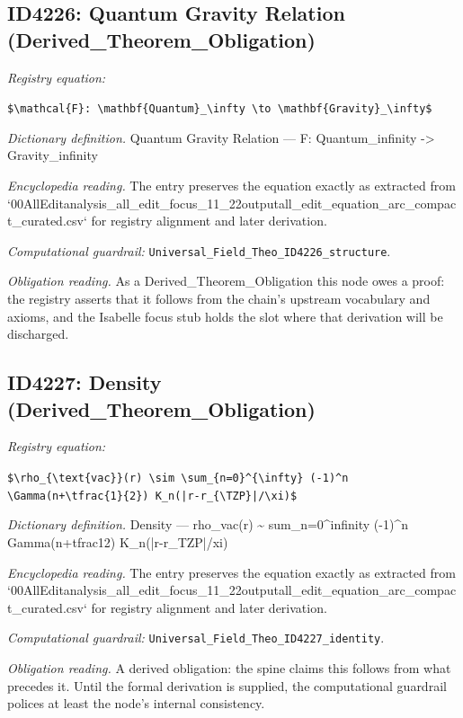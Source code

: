 \documentclass[11pt]{article}
\theoremstyle{remark}
\begin{document}
\subsection{ID4226: Quantum Gravity Relation (Derived\_Theorem\_Obligation)}

\noindent\textit{Registry equation:}\par
{\small\texttt{\$\textbackslash{}mathcal\{F\}: \textbackslash{}mathbf\{Quantum\}\_\textbackslash{}infty \textbackslash{}to \textbackslash{}mathbf\{Gravity\}\_\textbackslash{}infty\$}}\par\medskip
\noindent\textit{Dictionary definition.} Quantum Gravity Relation --- F: Quantum\_infinity -> Gravity\_infinity\par\medskip
\noindent\textit{Encyclopedia reading.} The entry preserves the equation exactly as extracted from `00AllEditanalysis\_all\_edit\_focus\_11\_22outputall\_edit\_equation\_arc\_compact\_curated.csv` for registry alignment and later derivation.
\par\medskip\noindent\textit{Computational guardrail:} \texttt{Universal\_Field\_Theo\_ID4226\_structure}.
\par\medskip\noindent\textit{Obligation reading.} As a Derived\_Theorem\_Obligation this node owes a proof: the registry asserts that it follows from the chain's upstream vocabulary and axioms, and the Isabelle focus stub holds the slot where that derivation will be discharged.

\subsection{ID4227: Density (Derived\_Theorem\_Obligation)}

\noindent\textit{Registry equation:}\par
{\small\texttt{\$\textbackslash{}rho\_\{\textbackslash{}text\{vac\}\}(r) \textbackslash{}sim \textbackslash{}sum\_\{n=0\}\textasciicircum{}\{\textbackslash{}infty\} (-1)\textasciicircum{}n \textbackslash{}Gamma(n+\textbackslash{}tfrac\{1\}\{2\}) K\_n(|r-r\_\{\textbackslash{}TZP\}|/\textbackslash{}xi)\$}}\par\medskip
\noindent\textit{Dictionary definition.} Density --- rho\_vac(r) \textasciitilde{} sum\_n=0\textasciicircum{}infinity (-1)\textasciicircum{}n Gamma(n+tfrac12) K\_n(|r-r\_TZP|/xi)\par\medskip
\noindent\textit{Encyclopedia reading.} The entry preserves the equation exactly as extracted from `00AllEditanalysis\_all\_edit\_focus\_11\_22outputall\_edit\_equation\_arc\_compact\_curated.csv` for registry alignment and later derivation.
\par\medskip\noindent\textit{Computational guardrail:} \texttt{Universal\_Field\_Theo\_ID4227\_identity}.
\par\medskip\noindent\textit{Obligation reading.} A derived obligation: the spine claims this follows from what precedes it. Until the formal derivation is supplied, the computational guardrail polices at least the node's internal consistency.
\end{document}

